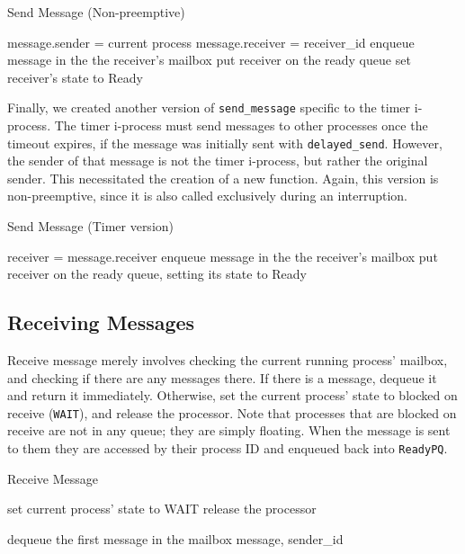 \documentclass[12pt]{report}
\begin{document}
\begin{algorithm}[H]
	\caption{Send Message (Non-preemptive)}
	\begin{algorithmic}[1]
			\State message.sender = current process
			\State message.receiver = receiver_id
			\State enqueue message in the the receiver's mailbox
				\State put receiver on the ready queue
				\State set receiver's state to Ready
			\EndIf
		\EndFunction
	\end{algorithmic}
\end{algorithm}


Finally, we created another version of \texttt{send_message} specific to the timer i-process. The timer i-process must send messages to other processes once the timeout expires, if the message was initially sent with \texttt{delayed_send}. However, the sender of that message is not the timer i-process, but rather the original sender. This necessitated the creation of a new function. Again, this version is non-preemptive, since it is also called exclusively during an interruption.

\begin{algorithm}[H]
	\caption{Send Message (Timer version)}
	\begin{algorithmic}[1]
			\State receiver = message.receiver
			\State enqueue message in the the receiver's mailbox
				\State put receiver on the ready queue, setting its state to Ready
			\EndIf
		\EndFunction
	\end{algorithmic}
\end{algorithm}

\subsection{Receiving Messages}

Receive message merely involves checking the current running process' mailbox, and checking if there are any messages there. If there is a message, dequeue it and return it immediately. Otherwise, set the current process' state to blocked on receive (\texttt{WAIT}), and release the processor.  Note that processes that are blocked on receive are not in any queue; they are simply floating.  When the message is sent to them they are accessed by their process ID and enqueued back into \texttt{ReadyPQ}.

\begin{algorithm}[H]
	\caption{Receive Message}
	\begin{algorithmic}[1]
				\State set current process' state to WAIT
				\State release the processor
			\EndWhile

			\State dequeue the first message in the mailbox
			\State\Return message, sender_id
		\EndFunction
	\end{algorithmic}
\end{algorithm}
\end{document}
